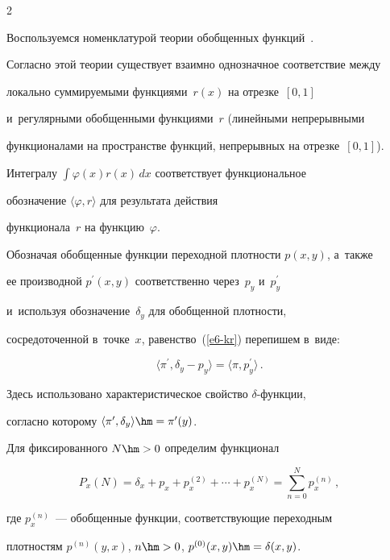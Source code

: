 \begin{multicols}{2}
  


  Воспользуемся номенклатурой тео\-рии обобщенных функций~\cite{14-kr}. 


Согласно этой тео\-рии существует взаимно однозначное соответствие между 


локально суммируемыми функциями~$r(x)$ на отрезке~$[0,1]$ 


и~регулярными обобщенными функциями~$r$ (линейными непрерывными 


функционалами на пространстве функций, непрерывных на отрезке~$[0, 1]$). 


Интегралу $\int \varphi(x) r(x)\,dx$ соответствует функциональное 


обозначение $\langle\varphi, r\rangle$ для результата действия 


функционала~$r$ на функцию~$\varphi$.


  


  Обозначая обобщенные функции переходной плот\-ности $p(x,y)$, а~так\-же 


ее производной $p^\prime(x,y)$ соответственно через~$p_y$ и~$p_y^\prime$ 


и~используя обозначение~$\delta_y$ для обобщенной плот\-ности, 


сосредоточенной в~точ\-ке~$x$, равенство~(\ref{e6-kr}) перепишем в~виде:


  \begin{equation}


  \langle \pi^\prime, \delta_y-p_y\rangle =\langle \pi, p_y^\prime\rangle\,.


  \label{e7-kr}


  \end{equation}


Здесь использовано характеристическое свойство $\delta$-функ\-ции, 


согласно которому $\langle\pi^\prime,\delta_y\rangle \hm= \pi^\prime(y)$.





  Для фиксированного $N\hm>0$ определим функционал


  $$


  P_x(N)=\delta_x +p_x+p_x^{(2)}+\cdots + p_x^{(N)}=\sum\limits^N_{n=0} 


p_x^{(n)}\,,


  $$


где $p_x^{(n)}$~--- обобщенные функции, со\-от\-вет\-ст\-ву\-ющие переходным 


плотностям $p^{(n)}(y,x)$, $n\hm> 0$, $p^{(0)}(x,y)\hm= \delta(x,y)$. 



\end{multicols}
